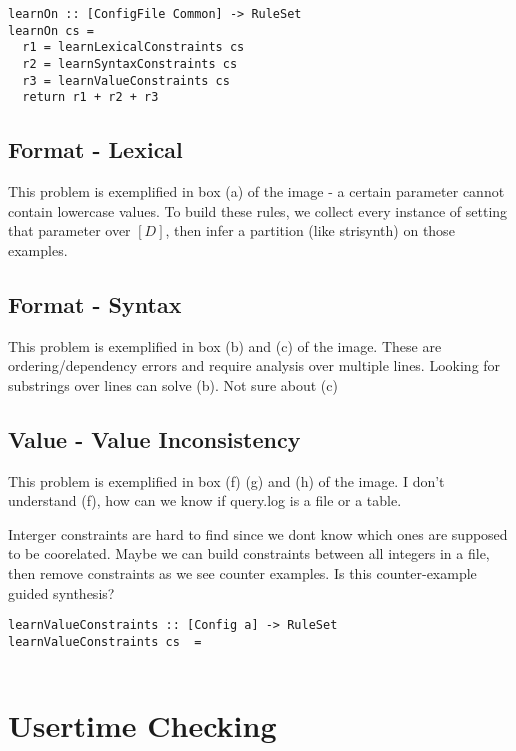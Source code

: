 \documentclass{article}
\begin{document}
\begin{lstlisting}
learnOn :: [ConfigFile Common] -> RuleSet
learnOn cs = 
  r1 = learnLexicalConstraints cs
  r2 = learnSyntaxConstraints cs
  r3 = learnValueConstraints cs
  return r1 + r2 + r3
\end{lstlisting}



\subsection{Format - Lexical}
This problem is exemplified in box (a) of the image - a certain parameter cannot contain lowercase values.
To build these rules, we collect every instance of setting that parameter over $[D]$, then infer a partition (like strisynth) on those examples.

\subsection{Format - Syntax}
This problem is exemplified in box (b) and (c) of the image.
These are ordering/dependency errors and require analysis over multiple lines.
Looking for substrings over lines can solve (b).
Not sure about (c)

\subsection{Value - Value Inconsistency}
This problem is exemplified in box (f) (g) and (h) of the image.
I don't understand (f), how can we know if query.log is a file or a table.

Interger constraints are hard to find since we dont know which ones are supposed to be coorelated.
Maybe we can build constraints between all integers in a file, then remove constraints as we see counter examples.
Is this counter-example guided synthesis?

\begin{lstlisting}
learnValueConstraints :: [Config a] -> RuleSet
learnValueConstraints cs  =
  
\end{lstlisting}




\section{Usertime Checking}




\end{document}
